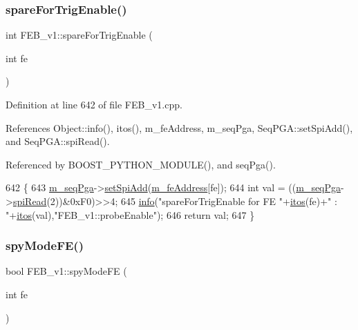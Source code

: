 \subsubsection{\texorpdfstring{spare\+For\+Trig\+Enable()}{spareForTrigEnable()}}
{\footnotesize\ttfamily int F\+E\+B\+\_\+v1\+::spare\+For\+Trig\+Enable (\begin{DoxyParamCaption}\item[{int}]{fe }\end{DoxyParamCaption})}



Definition at line 642 of file F\+E\+B\+\_\+v1.\+cpp.



References Object\+::info(), itos(), m\+\_\+fe\+Address, m\+\_\+seq\+Pga, Seq\+P\+G\+A\+::set\+Spi\+Add(), and Seq\+P\+G\+A\+::spi\+Read().



Referenced by B\+O\+O\+S\+T\+\_\+\+P\+Y\+T\+H\+O\+N\+\_\+\+M\+O\+D\+U\+L\+E(), and seq\+Pga().


\begin{DoxyCode}
642                                     \{
643   \hyperlink{classFEB__v1_a6c7804ac86796f233a8393043adf2e77}{m\_seqPga}->\hyperlink{classSeqPGA_ac998ce3a6d9b5f2e88cc8393f8c1df53}{setSpiAdd}(\hyperlink{classFEB__v1_a4e1945c2d5b434125f375e9d0fc6d99f}{m\_feAddress}[fe]);
644   \textcolor{keywordtype}{int} val = ((\hyperlink{classFEB__v1_a6c7804ac86796f233a8393043adf2e77}{m\_seqPga}->\hyperlink{classSeqPGA_ab3d0e5e5d4014bc7a92588a76b8713d4}{spiRead}(2))&0xF0)>>4;
645   \hyperlink{classObject_a644fd329ea4cb85f54fa6846484b84a8}{info}(\textcolor{stringliteral}{"spareForTrigEnable for FE "}+\hyperlink{Tools_8h_af330027dbdafb9a30768b3613c553e60}{itos}(fe)+\textcolor{stringliteral}{" : "}+\hyperlink{Tools_8h_af330027dbdafb9a30768b3613c553e60}{itos}(val),\textcolor{stringliteral}{"FEB\_v1::probeEnable"});
646   \textcolor{keywordflow}{return} val;
647 \}
\end{DoxyCode}
\mbox{\label{classFEB__v1_a0b6d25515e575e370552c6b6f715fd76}} 
\subsubsection{\texorpdfstring{spy\+Mode\+F\+E()}{spyModeFE()}}
{\footnotesize\ttfamily bool F\+E\+B\+\_\+v1\+::spy\+Mode\+FE (\begin{DoxyParamCaption}\item[{int}]{fe }\end{DoxyParamCaption})}



